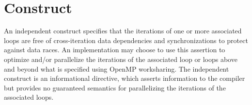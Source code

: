%
%
%
%
%
%
%
%
%
%
%
%
%


\section{ Construct}
\label{sec:independent Construct}
\summary
An independent construct specifies that the iterations of one or more
associated loops are free of cross-iteration data dependencies and
synchronizations to protect against data races. An implementation may choose
to use this assertion to optimize and/or parallelize the iterations of the
associated loop or loops above and beyond what is specified using OpenMP
worksharing. The independent construct is an informational directive, which
asserts information to the compiler but provides no guaranteed semantics for
parallelizing the iterations of the associated loops.

